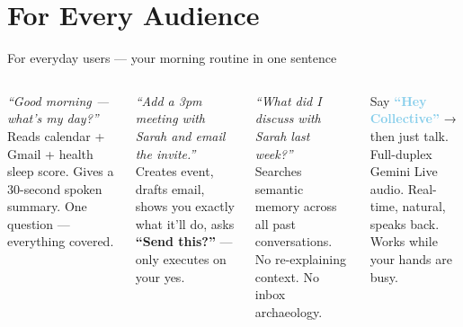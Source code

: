 \documentclass[aspectratio=169, 10pt]{beamer}
\newcommand{\hl}[1]{\textcolor{skyblue}{\textbf{#1}}}
\begin{document}
\section{For Every Audience}

\begin{frame}{For everyday users — your morning routine in one sentence}
  \begin{columns}[T]
      \begin{tcolorbox}[skycard, title={\faSun\; Morning Briefing (Voice)}]
        \small
        \textit{``Good morning — what's my day?''}\\[3pt]
        {\color{dimcol}Reads calendar + Gmail + health sleep score.
        Gives a 30-second spoken summary. One question — everything covered.}
      \end{tcolorbox}
      \vspace{4pt}
      \begin{tcolorbox}[greencard, title={\faCheckCircle\; Action With Confirmation}]
        \small
        \textit{``Add a 3pm meeting with Sarah and email the invite.''}\\[3pt]
        {\color{dimcol}Creates event, drafts email, shows you exactly what it'll do, asks \textbf{``Send this?''} — only executes on your yes.}
      \end{tcolorbox}

      \begin{tcolorbox}[ambercard, title={\faBrain\; Memory Across Sessions}]
        \small
        \textit{``What did I discuss with Sarah last week?''}\\[3pt]
        {\color{dimcol}Searches semantic memory across all past conversations. No re-explaining context. No inbox archaeology.}
      \end{tcolorbox}
      \vspace{4pt}
      \begin{tcolorbox}[indigocard, title={\faMicrophone\; Voice-First}]
        \small
        Say \hl{``Hey Collective''} → then just talk.\\[3pt]
        {\color{dimcol}Full-duplex Gemini Live audio. Real-time, natural, speaks back. Works while your hands are busy.}
      \end{tcolorbox}
  \end{columns}
\end{frame}
\end{document}
